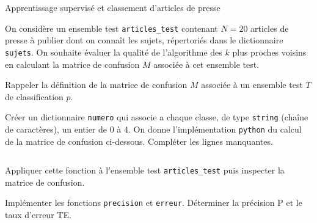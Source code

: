 \begin{exo}[PC][2][TD]{Apprentissage supervisé et classement d'articles de presse}
\begin{quest}
\end{quest}

 On considère un ensemble test \texttt{articles\_test} contenant $N=20$ articles de presse à publier dont on connaît les sujets, répertoriés dans le dictionnaire \texttt{sujets}. 
On souhaite évaluer la qualité de l'algorithme des $k$ plus proches voisins en calculant la matrice de confusion $M$ associée à cet ensemble test. 
\begin{quest}
  \item	Rappeler la définition de la matrice de confusion $M$ associée à un ensemble test $T$ de classification $p$. 
\item Créer un dictionnaire \texttt{numero} qui associe a chaque classe, de type \texttt{string} (chaîne de caractères), un entier de 0 à 4.
On donne l'implémentation \texttt{python} du calcul de la matrice de confusion ci-dessous. Compléter les lignes manquantes.
  \inputminted[linenos=true,frame=single]{python}{\pathtoexos/Info/Scripts/matrice_confus.py}
Appliquer cette fonction à l'ensemble test \texttt{articles\_test} puis inspecter la matrice de confusion.
\item Implémenter les fonctions \texttt{precision} et \texttt{erreur}. Déterminer la précision P et le taux d'erreur TE.
\end{quest}

  


\end{exo}

